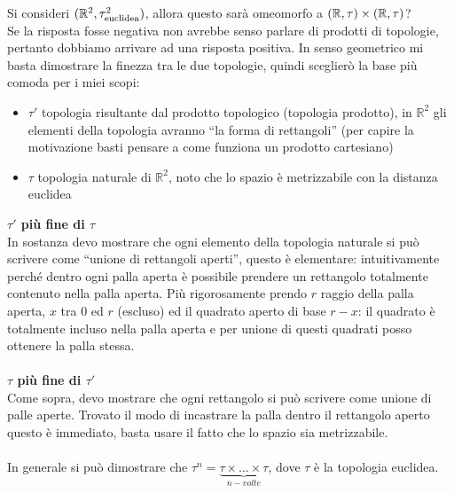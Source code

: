 \begin{example}
	Si consideri $(\mathbb{R}^2, \tau^2_{\text{euclidea}})$, allora questo sarà omeomorfo a $(\mathbb{R}, \tau) \times (\mathbb{R}, \tau)$? \\ Se la risposta fosse negativa non avrebbe senso parlare di prodotti di topologie, pertanto dobbiamo arrivare ad una risposta positiva. 
	In senso geometrico mi basta dimostrare la finezza tra le due topologie, quindi sceglierò la base più comoda per i miei scopi:
	\begin{itemize}
		\item $\tau'$ topologia risultante dal prodotto topologico (topologia prodotto), in $\mathbb{R}^2$ gli elementi della topologia avranno \enquote{la forma di rettangoli} (per capire la motivazione basti pensare a come funziona un prodotto cartesiano)
		\item $\tau$ topologia naturale di $\mathbb{R}^2$, noto che lo spazio è metrizzabile con la distanza euclidea
	\end{itemize}
	\textbf{$\tau'$ più fine di $\tau$}\\ In sostanza devo mostrare che ogni elemento della topologia naturale si può scrivere come \enquote{unione di rettangoli aperti}, questo è elementare: intuitivamente perché dentro ogni palla aperta è possibile prendere un rettangolo totalmente contenuto nella palla aperta. Più rigorosamente prendo $r$ raggio della palla aperta, $x$ tra $0$ ed $r$ (escluso) ed il quadrato aperto di base $r-x$: il quadrato è totalmente incluso nella palla aperta e per unione di questi quadrati posso ottenere la palla stessa. \\ \\
	\textbf{$\tau$ più fine di $\tau'$}\\ Come sopra, devo mostrare che ogni rettangolo si può scrivere come unione di palle aperte. Trovato il modo di incastrare la palla dentro il rettangolo aperto questo è immediato, basta usare il fatto che lo spazio sia metrizzabile. \\ \\
	In generale si può dimostrare che $\tau^n = \underset{n-volte}{\underbrace{\tau \times \dots \times \tau}}$, dove $\tau$ è la topologia euclidea. 
\end{example}


